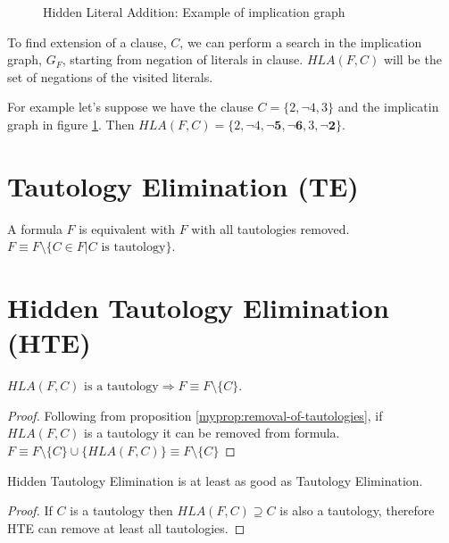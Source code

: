\begin{figure}[h]
  \centering
  \caption{Hidden Literal Addition: Example of implication graph}
  \label{fig:hla}
\end{figure}

To find extension of a clause, $C$, we can perform a search in the implication
graph, $G_F$, starting from negation of literals in clause. $HLA(F, C)$ will
be the set of negations of the visited literals.

For example let's suppose we have the clause $C = \{ 2, \neg 4, 3\}$
and the implicatin graph in figure \ref{fig:hla}. Then $HLA(F, C)
= \{2, \neg 4, \mathbf{\neg 5, \neg 6}, 3, \mathbf{\neg 2} \}$.


\section{Tautology Elimination (TE)}

\begin{myprop}[TE]
  \label{myprop:removal-of-tautologies}
  A formula $F$ is equivalent with $F$ with all tautologies removed.
  $F \equiv F \setminus \{ C \in F | C \text{ is tautology}\}$.
\end{myprop}


\section{Hidden Tautology Elimination (HTE)}
\label{sec:hte}

\begin{myprop}[HTE]
  $HLA(F, C) \text{ is a tautology} \Rightarrow F \equiv F \setminus \{C\}$.
\end{myprop}

\begin{proof}
  Following from proposition \ref{myprop:removal-of-tautologies},
  if $HLA(F, C)$ is a tautology it can be removed from formula.
  $F \equiv F \setminus \{C\} \cup \{HLA(F, C)\} \equiv F \setminus \{C\}$
\end{proof}

\begin{myprop}
  Hidden Tautology Elimination is at least as good as Tautology Elimination.
\end{myprop}

\begin{proof}
  If $C$ is a tautology then $HLA(F, C) \supseteq C$ is also a tautology,
  therefore HTE can remove at least all tautologies.
\end{proof}

